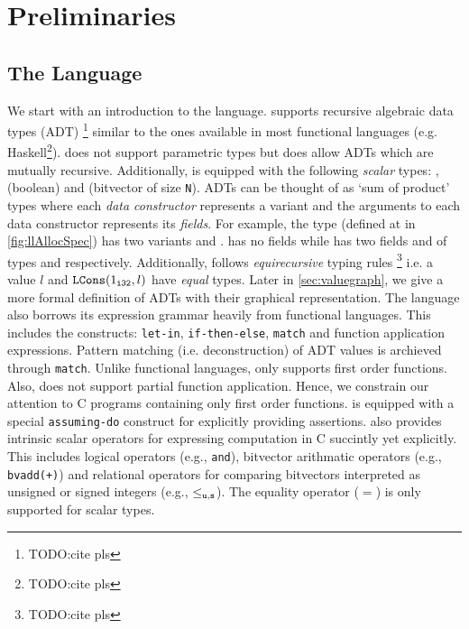 \section{Preliminaries}
\label{sec:prelims}

\subsection{The \SpecL{} Language}
\label{sec:speclang}
We start with an introduction to the \SpecL{} language.
\SpecL{} supports recursive algebraic data types (ADT) \footnote{TODO:cite pls} similar to the ones available in most functional languages (e.g. Haskell\footnote{TODO:cite pls}).
\SpecL{} does not support parametric types but does allow ADTs which are mutually recursive.
Additionally, \SpecL{} is equipped with the following {\em scalar} types: ,  (boolean) and  (bitvector of size {\tt N}).
ADTs can be thought of as `sum of product' types where each {\em data constructor} represents a variant
and the arguments to each data constructor represents its {\em fields}.
For example, the  type (defined at  in \cref{fig:llAllocSpec}) has two variants  and .
 has no fields while  has two fields  and  of types  and  respectively.
Additionally, \SpecL{} follows {\em equirecursive} typing rules \footnote{TODO:cite pls} i.e.
a  value $l$ and ${\tt LCons}(1_{\tt i32}, l)$ have {\em equal} types.
Later in \cref{sec:valuegraph}, we give a more formal definition of ADTs with their graphical representation.
The language also borrows its expression grammar heavily from functional languages.
This includes the constructs: {\tt let-in}, {\tt if-then-else}, {\tt match} and function application expressions.
Pattern matching (i.e. deconstruction) of ADT values is archieved through {\tt match}.
Unlike functional languages, \SpecL{} only supports first order functions.
Also, \SpecL{} does not support partial function application.
Hence, we constrain our attention to C programs containing only first order functions.
\SpecL{} is equipped with a special {\tt assuming-do} construct for explicitly providing assertions.
\SpecL{} also provides intrinsic scalar operators for expressing computation in C succintly yet explicitly.
This includes logical operators (e.g., {\tt and}), bitvector arithmatic operators (e.g., {\tt bvadd(+)}) and
relational operators for comparing bitvectors interpreted as unsigned or signed integers (e.g., {\tt $\leq_{\tt u,s}$}).
The equality operator ($=$) is only supported for scalar types.

